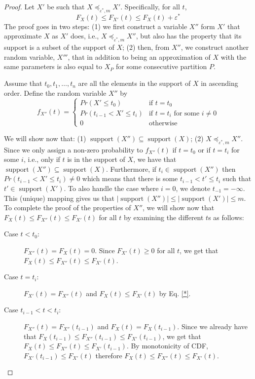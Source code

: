\documentclass[review]{elsarticle}
\DeclareMathOperator{\support}{support}
\begin{document}
\begin{proof}
Let $X'$ be such that $X \preceq_{\varepsilon^*,m} X'$. Specifically, for all $t$,
\begin{equation}
F_{X}(t) \leq F_{X'}(t) \leq F_X(t)+\varepsilon^*
\label{*}
\end{equation}
The proof goes in two steps: (1) we first construct a variable $X''$ form $X'$ that approximate $X$ as $X'$ does, i.e., $X \preceq_{\varepsilon^*,m} X''$, but also has the property that its support is a subset of the support of $X$; (2) then, from $X''$, we construct another random variable, $X'''$, that in addition to being an approximation of $X$ with the same parameters is also equal to $X_P$ for some consecutive partition $P$. 


Assume that $t_0,t_1,\dots,t_n$ are all the elements in the support of $X$ in ascending order. Define the random variable $X''$ by 
$$
f_{X''}(t) = \begin{cases}
Pr(X' \leq t_0)           & \text{if } t=t_0  \\ 
Pr(t_{i-1} < X' \leq t_i) & \text{if } t=t_i \text{ for some } i \neq 0 \\ 
0                         & \text{otherwise}
\end{cases}
$$

We will show now that: (1) $\support(X'') \subseteq \support(X)$; (2) $X \preceq_{\varepsilon^*,m} X''$.
Since we only assign a non-zero probability to $f_{X''}(t)$ if $t=t_0$ or if $t=t_i$ for some $i$, i.e., only if $t$ is in the support of $X$, we have that $\support(X'') \subseteq \support(X)$. 
Furthermore, if $t_i \in \support(X'')$ then $Pr(t_{i-1} < X' \leq t_i) \neq 0$ which means that there is some $t_{i-1} < t' \leq t_i$ such that $t' \in \support(X')$. To also handle the case where $i=0$, we denote $t_{-1}=-\infty$. This (unique) mapping gives us that $|\support(X'')| \leq |\support(X')| \leq m$. To complete the proof of the properties of $X''$, we will show now that $F_{X}(t) \leq  F_{X''}(t) \leq F_{X'}(t)$ for all $t$ by examining the different $t$s as follows: 
\begin{description}
\item[Case $t < t_0$:] $F_{X''}(t)=F_{X}(t)=0$. Since $F_{X'}(t) \geq 0$ for all $t$, we get that $F_{X}(t) \leq  F_{X''}(t) \leq F_{X'}(t)$.
\item[Case $t=t_i$:] $F_{X'}(t)=F_{X''}(t)$ and $F_{X}(t) \leq F_{X'}(t)$ by Eq. \eqref{*}.
\item[Case $t_{i-1} < t < t_i$:] $F_{X''}(t)= F_{X''}(t_{i-1})$ and $F_{X}(t)=F_{X}(t_{i-1})$. Since we already have that $F_{X}(t_{i-1}) \leq F_{X''}(t_{i-1}) \leq F_{X'}(t_{i-1})$, we get that $F_{X}(t) \leq F_{X''}(t) \leq F_{X'}(t_{i-1})$. By monotonicity of CDF, $F_{X'}(t_{i-1}) \leq F_{X'}(t)$ therefore $F_{X}(t) \leq F_{X''}(t) \leq F_{X'}(t)$.


\end{description}
\end{proof}
\end{document}
